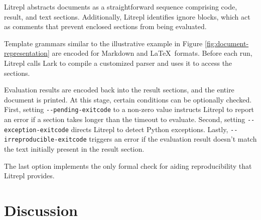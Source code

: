 \documentclass[letterpaper,12pt,twocolumn]{article}
\newcommand{\Latex}{\LaTeX\ }
\begin{document}
Litrepl abstracts documents as a straightforward sequence comprising code,
result, and text sections. Additionally, Litrepl identifies ignore blocks, which
act as comments that prevent enclosed sections from being evaluated.

Template grammars similar to the illustrative example in Figure
\ref{fig:document-representation} are encoded for Markdown and \Latex formats.
Before each run, Litrepl calls Lark\textcite{Lark} to compile a customized
parser and uses it to access the sections.

Evaluation results are encoded back into the result sections, and the entire
document is printed. At this stage, certain conditions can be optionally
checked. First, setting \verb|--pending-exitcode| to a non-zero value instructs
Litrepl to report an error if a section takes longer than the timeout to
evaluate. Second, setting \verb|--exception-exitcode| directs Litrepl to detect
Python exceptions. Lastly, \verb|--irreproducible-exitcode| triggers an error if
the evaluation result doesn't match the text initially present in the result
section.

The last option implements the only formal check for aiding reproducibility that
Litrepl provides.

\section{Discussion}
\end{document}
